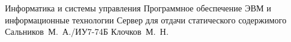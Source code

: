 \documentclass{bmstu}
\begin{document}
	
	\makecourseworktitle
	{Информатика и системы управления}
	{Программное обеспечение ЭВМ и информационные технологии}
	{Сервер для отдачи статического содержимого}
	{Сальников~М.~А./ИУ7-74Б}
	{Клочков~М.~Н.}
	{}
	
	\setcounter{page}{3}

	\maketableofcontents
	
	
	
	
	
	
	
	
	
	
	
	\makebibliography
	
	
	
	
\end{document}
